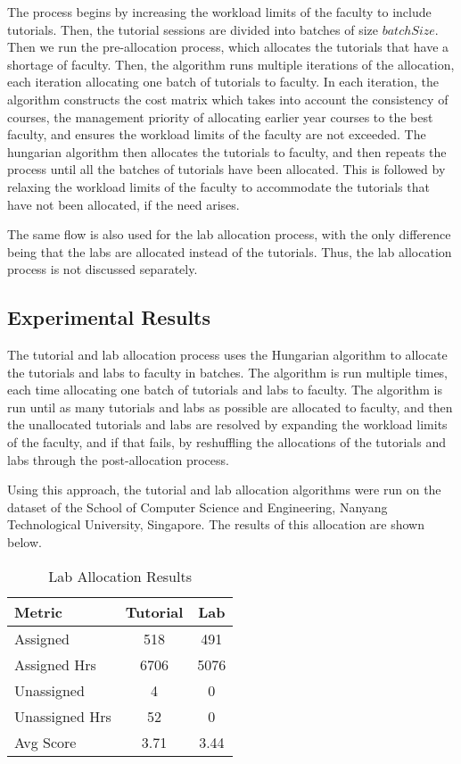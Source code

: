 The process begins by increasing the workload limits of the faculty to include tutorials. Then, the tutorial sessions are divided into batches of size $batchSize$. Then we run the pre-allocation process, which allocates the tutorials that have a shortage of faculty. Then, the algorithm runs multiple iterations of the allocation, each iteration allocating one batch of tutorials to faculty. In each iteration, the algorithm constructs the cost matrix which takes into account the consistency of courses, the management priority of allocating earlier year courses to the best faculty, and ensures the workload limits of the faculty are not exceeded. The hungarian algorithm then allocates the tutorials to faculty, and then repeats the process until all the batches of tutorials have been allocated. This is followed by relaxing the workload limits of the faculty to accommodate the tutorials that have not been allocated, if the need arises.

The same flow is also used for the lab allocation process, with the only difference being that the labs are allocated instead of the tutorials. Thus, the lab allocation process is not discussed separately.

\subsection{Experimental Results}

The tutorial and lab allocation process uses the Hungarian algorithm to allocate the tutorials and labs to faculty in batches. The algorithm is run multiple times, each time allocating one batch of tutorials and labs to faculty. The algorithm is run until as many tutorials and labs as possible are allocated to faculty, and then the unallocated tutorials and labs are resolved by expanding the workload limits of the faculty, and if that fails, by reshuffling the allocations of the tutorials and labs through the post-allocation process.

Using this approach, the tutorial and lab allocation algorithms were run on the dataset of  the School of Computer Science and Engineering, Nanyang Technological University, Singapore. The results of this allocation are shown below.

\begin{table}[h]
  \centering
  \begin{tabular}{|l|c|c|}
    \hline
    \textbf{Metric} & \textbf{Tutorial} & \textbf{Lab} \\ \hline
    Assigned        & 518               & 491          \\
    Assigned Hrs    & 6706              & 5076         \\ \hline
    Unassigned      & 4                 & 0            \\
    Unassigned Hrs  & 52                & 0            \\ \hline
    Avg Score       & 3.71              & 3.44         \\
    \hline
  \end{tabular}
  \caption{Lab Allocation Results}
  \label{tab:tut_lab_allocation_results}
\end{table}

